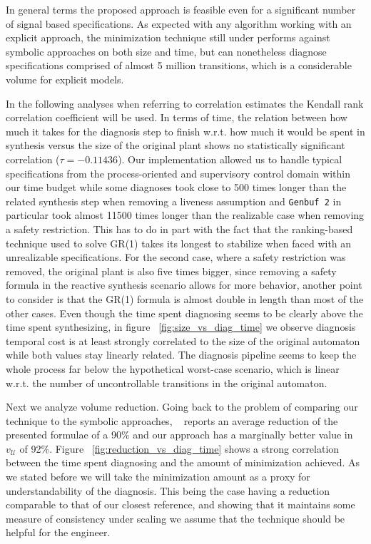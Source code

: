 In general terms the proposed approach is feasible even for a significant number of signal based specifications. 
As expected with any algorithm working with an explicit approach, the minimization technique still under performs against symbolic approaches on both size and time, but can nonetheless diagnose specifications comprised of almost 5 million transitions, which is a considerable volume for explicit models.  

In the following analyses when referring to correlation estimates the Kendall rank correlation coefficient will be used. 
In terms of time, the relation between how much it takes for the diagnosis step to finish  w.r.t. how much it would be spent in synthesis versus the size of the original plant shows no statistically significant correlation ($\tau=-0.11436$). Our implementation allowed us to handle typical specifications from the process-oriented and supervisory control domain within our time budget while some diagnoses took close to 500 times longer than the related synthesis step when removing a liveness assumption and \texttt{Genbuf 2} in particular took almost 11500 times longer than the realizable case when removing a safety restriction. This has to do in part with the fact that the ranking-based technique used to solve GR(1) takes its longest to stabilize when faced with an unrealizable specifications. For the second case, where a safety restriction was removed, the original plant is also five times bigger, since removing a safety formula in the reactive synthesis scenario allows for more behavior, another point to consider is that the GR(1) formula is almost double in length than most of the other cases. 
Even though the time spent diagnosing seems to be clearly above the time spent synthesizing, in figure ~\ref{fig:size_vs_diag_time} we observe diagnosis temporal cost is at least strongly correlated to the size of the original automaton while both values stay linearly related. 
The diagnosis pipeline seems to keep the whole process far below the hypothetical worst-case scenario, which is linear w.r.t. the number of uncontrollable transitions in the original automaton.  

Next we analyze volume reduction. Going back to the problem of comparing our technique to the symbolic approaches, ~\cite{DBLP:conf/hvc/KonighoferHB10} reports an average reduction of the presented formulae of a 90\% and our approach has a marginally better value in $v_{\mathcal{U}}$ of 92\%. Figure ~\ref{fig:reduction_vs_diag_time} shows a strong correlation between the time spent diagnosing and the amount of minimization achieved. As we stated before we will take the minimization amount as a proxy for understandability of the diagnosis. This being the case having a reduction comparable to that of our closest reference, and showing that it maintains some measure of consistency under scaling we assume that the technique should be helpful for the engineer.

